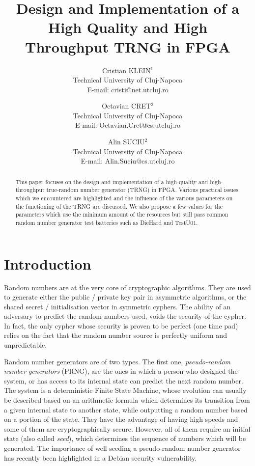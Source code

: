 \documentclass[conference]{IEEEtran}
\title{Design and Implementation of a High Quality and High Throughput TRNG in FPGA}
\author{Cristian KLEIN$^1$\\
Technical University of Cluj-Napoca\\
E-mail: cristi@net.utcluj.ro
\and
Octavian CRET$^2$\\
Technical University of Cluj-Napoca\\
E-mail: Octavian.Cret@cs.utcluj.ro
\and
Alin SUCIU$^2$\\
Technical University of Cluj-Napoca\\
E-mail: Alin.Suciu@cs.utcluj.ro
}
\begin{document}
\maketitle
{}

\begin{abstract}
This paper focuses on the design and implementation of a high-quality and high-throughput true-random number generator (TRNG) in FPGA. Various practical issues which we encountered are highlighted and the influence of the various parameters on the functioning of the TRNG are discussed. We also propose a few values for the parameters which use the minimum amount of the resources but still pass common random number generator test batteries such as DieHard and TestU01.
\end{abstract}

\section{Introduction}
Random numbers are at the very core of cryptographic algorithms. They are used to generate either the public / private key pair in asymmetric algorithms, or the shared secret / initialisation vector in symmetric cyphers. The ability of an adversary to predict the random numbers used, voids 
the security of the cypher. In fact, the only cypher whose security is proven to be perfect (one time pad) relies on the fact that the random number source is perfectly uniform and unpredictable.

Random number generators are of two types. The first one, \emph{pseudo-random number generators} (PRNG), are the ones in which a person who designed the system, or has access to its internal state can predict the next random number. The system is a deterministic Finite State Machine, whose evolution can usually be described based on an arithmetic formula which determines its transition from a given internal state to another state, while outputting a random number based on a portion of the state. They have the advantage of having high speeds and some of them are cryptographically secure. However, all of them require an initial state (also called \emph{seed}), which determines the sequence of numbers which will be generated. The importance of well seeding a pseudo-random number generator has recently been highlighted in a Debian security vulnerability\cite{De08}.
\end{document}
